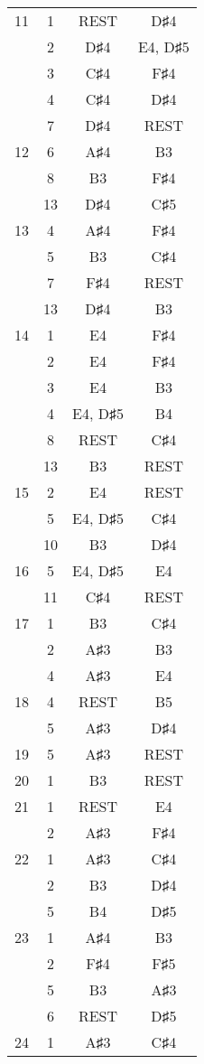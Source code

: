 \documentclass{article}
\begin{document}
\begin{longtable}{|c|c|c|c|}
\hline
11 & 1 & REST & D♯4 \\ 
  & 2 & D♯4 & E4, D♯5 \\ 
  & 3 & C♯4 & F♯4 \\ 
  & 4 & C♯4 & D♯4 \\ 
  & 7 & D♯4 & REST \\ 
\hline
12 & 6 & A♯4 & B3 \\ 
  & 8 & B3 & F♯4 \\ 
  & 13 & D♯4 & C♯5 \\ 
\hline
13 & 4 & A♯4 & F♯4 \\ 
  & 5 & B3 & C♯4 \\ 
  & 7 & F♯4 & REST \\ 
  & 13 & D♯4 & B3 \\ 
\hline
14 & 1 & E4 & F♯4 \\ 
  & 2 & E4 & F♯4 \\ 
  & 3 & E4 & B3 \\ 
  & 4 & E4, D♯5 & B4 \\ 
  & 8 & REST & C♯4 \\ 
  & 13 & B3 & REST \\ 
\hline
15 & 2 & E4 & REST \\ 
  & 5 & E4, D♯5 & C♯4 \\ 
  & 10 & B3 & D♯4 \\ 
\hline
16 & 5 & E4, D♯5 & E4 \\ 
  & 11 & C♯4 & REST \\ 
\hline
17 & 1 & B3 & C♯4 \\ 
  & 2 & A♯3 & B3 \\ 
  & 4 & A♯3 & E4 \\ 
\hline
18 & 4 & REST & B5 \\ 
  & 5 & A♯3 & D♯4 \\ 
\hline
19 & 5 & A♯3 & REST \\ 
\hline
20 & 1 & B3 & REST \\ 
\hline
21 & 1 & REST & E4 \\ 
  & 2 & A♯3 & F♯4 \\ 
\hline
22 & 1 & A♯3 & C♯4 \\ 
  & 2 & B3 & D♯4 \\ 
  & 5 & B4 & D♯5 \\ 
\hline
23 & 1 & A♯4 & B3 \\ 
  & 2 & F♯4 & F♯5 \\ 
  & 5 & B3 & A♯3 \\ 
  & 6 & REST & D♯5 \\ 
\hline
24 & 1 & A♯3 & C♯4 \\ 

\end{longtable}
\end{document}
